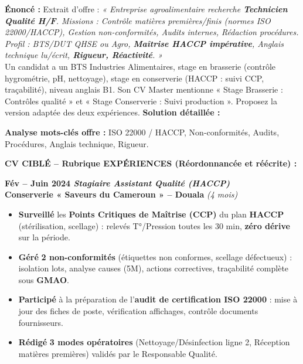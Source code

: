 \documentclass[11pt]{article}
\newcommand{\cle}[1]{{\popxbold\color{popdark}#1}}
\begin{document}
\begin{exoresolu}
\textbf{Énoncé :} Extrait d'offre : \emph{« Entreprise agroalimentaire recherche \textbf{Technicien Qualité H/F}. Missions : Contrôle matières premières/finis (normes ISO 22000/HACCP), Gestion non-conformités, Audits internes, Rédaction procédures. Profil : BTS/DUT QHSE ou Agro, \textbf{Maîtrise HACCP impérative}, Anglais technique lu/écrit, \textbf{Rigueur, Réactivité}. »} \\
Un candidat a un BTS Industries Alimentaires, stage en brasserie (contrôle hygrométrie, pH, nettoyage), stage en conserverie (HACCP : suivi CCP, traçabilité), niveau anglais B1. Son CV Master mentionne « Stage Brasserie : Contrôles qualité » et « Stage Conserverie : Suivi production ». Proposez la version adaptée des deux expériences.
\tcblower
\textbf{Solution détaillée :}

\textbf{Analyse mots-clés offre :} \cle{ISO 22000 / HACCP}, \cle{Non-conformités}, \cle{Audits}, \cle{Procédures}, \cle{Anglais technique}, \cle{Rigueur}.

\textbf{CV CIBLÉ -- Rubrique EXPÉRIENCES (Réordonnancée et réécrite) :}

\textbf{Fév -- Juin 2024 \hfill \emph{Stagiaire Assistant Qualité (HACCP)}} \\
\textbf{Conserverie « Saveurs du Cameroun » -- Douala} \hfill \emph{(4 mois)}
\begin{itemize}
    \item \textbf{Surveillé} les \textbf{Points Critiques de Maîtrise (CCP)} du plan \textbf{HACCP} (stérilisation, scellage) : relevés T°/Pression toutes les 30 min, \textbf{zéro dérive} sur la période.
    \item \textbf{Géré} \textbf{2 non-conformités} (étiquettes non conformes, scellage défectueux) : isolation lots, analyse causes (5M), actions correctives, traçabilité complète sous \textbf{GMAO}.
    \item \textbf{Participé} à la préparation de l'\textbf{audit de certification ISO 22000} : mise à jour des fiches de poste, vérification affichages, contrôle documents fournisseurs.
    \item \textbf{Rédigé} \textbf{3 modes opératoires} (Nettoyage/Désinfection ligne 2, Réception matières premières) validés par le Responsable Qualité.
\end{itemize}


\end{exoresolu}
\end{document}
